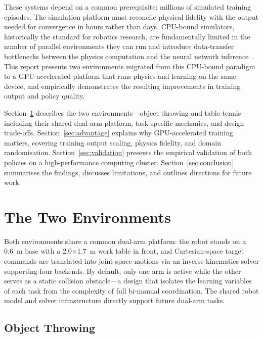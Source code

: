 \documentclass[11pt, a4paper]{article}
\begin{document}
These systems depend on a common prerequisite: millions of simulated training episodes. The simulation platform must reconcile physical fidelity with the output needed for convergence in hours rather than days. CPU-bound simulators, historically the standard for robotics research, are fundamentally limited in the number of parallel environments they can run and introduce data-transfer bottlenecks between the physics computation and the neural network inference~\cite{isaac_lab}. This report presents two environments migrated from this CPU-bound paradigm to a GPU-accelerated platform that runs physics and learning on the same device, and empirically demonstrates the resulting improvements in training output and policy quality.

Section~\ref{sec:environments} describes the two environments---object throwing and table tennis---including their shared dual-arm platform, task-specific mechanics, and design trade-offs. Section~\ref{sec:advantage} explains why GPU-accelerated training matters, covering training output scaling, physics fidelity, and domain randomisation. Section~\ref{sec:validation} presents the empirical validation of both policies on a high-performance computing cluster. Section~\ref{sec:conclusion} summarises the findings, discusses limitations, and outlines directions for future work.

\section{The Two Environments}
\label{sec:environments}

Both environments share a common dual-arm platform: the robot stands on a 0.6~m base with a 2.0$\times$1.7~m work table in front, and Cartesian-space target commands are translated into joint-space motions via an inverse-kinematics solver supporting four backends. By default, only one arm is active while the other serves as a static collision obstacle---a design that isolates the learning variables of each task from the complexity of full bi-manual coordination. The shared robot model and solver infrastructure directly support future dual-arm tasks.

\subsection{Object Throwing}
\end{document}
